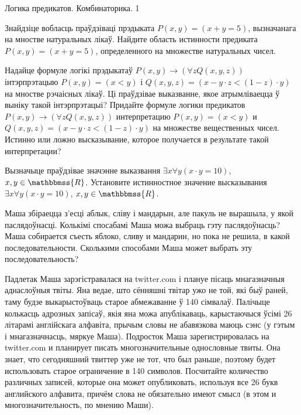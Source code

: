 \documentclass[12pt, a4paper]{article}
\begin{document}
{Логика предикатов. Комбинаторика.}
{1}

\begin{problemList}

\problemItemSimple
{Знайдзіце вобласць праўдзіваці прэдыката $P(x, y) = (x + y = 5)$, вызначанага на мностве натуральных лікаў.}
{Найдите область истинности предиката $P(x, y) = (x + y = 5)$, определенного на множестве натуральных чисел.}

\bigskip

\problemItemSimple
{Надайце формуле логікі прэдыкатаў $P(x, y) \to (\forall{ z Q(x, y, z)})$ інтэрпрэтацыю $P(x, y) = (x < y)$ і $Q(x, y, z) = (x - y \cdot z < (1 - z) \cdot y)$ на мностве рэчаісных лікаў.
Ці праўдзівае выказванне, якое атрымліваецца ў выніку такой інтэрпрэтацыі?}
{Придайте формуле логики предикатов $P(x, y) \to (\forall{ z Q(x, y, z)})$ интерпретацию $P(x, y) = (x < y)$ и $Q(x, y, z) = (x - y \cdot z < (1 - z) \cdot y)$ на множестве вещественных чисел.
Истинно или ложно высказывание, которое получается в результате такой интерпретации?}

\bigskip

\problemItemSimple
{Вызначыце праўдзівае значэнне выказвання $\exists{x \forall{y {(x \cdot y = 10)}}}$, $x, y \in \mathbbmss{R}$.}
{Установите истинностное значение высказывания $\exists{x \forall{y {(x \cdot y = 10)}}}$, $x, y \in \mathbbmss{R}$.}

\bigskip

\problemItemSimple
{Маша збіраецца з'есці аблык, сліву і мандарын, але пакуль  не вырашыла, у якой паслядоўнасці.
Колькімі спосабамі Маша можа выбраць гэту паслядоўнасць?}
{Маша собирается съесть яблоко, сливу и мандарин, но пока не решила, в какой последовательности.
Сколькими способами Маша может выбрать эту последовательность?}

\bigskip

\problemItemSimple
{Падлетак Маша зарэгістравалася на twitter.com і плануе пісаць мнагазначныя аднаслоўныя твіты.
Яна ведае, што сённяшні твітар ужо не той, які быў раней, таму будзе выкарыстоўваць старое абмежаванне ў 140 сімвалаў.
Палічыце колькасць адрозных запісаў, якія яна можа апублікаваць, карыстаючыся ўсімі 26 літарамі англійскага алфавіта,
прычым словы не абавязкова маюць сэнс (у гэтым і мнагазначнасць, мяркуе Маша).}
{Подросток Маша зарегистрировалась на twitter.com и планирует писать многозначительные однословные твиты.
Она знает, что сегодняшний твиттер уже не тот, что был раньше, поэтому будет использовать старое ограничение в 140 символов.
Посчитайте количество различных записей, которые она может опубликовать, используя все 26 букв английского алфавита,
причём слова не обязательно имеют смысл (в этом и многозначительность, по мнению Маши).}


\end{problemList}
\end{document}
